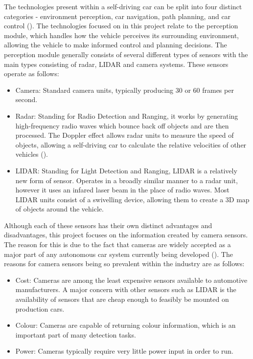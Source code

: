 \documentclass[12pt]{report}
\begin{document}
\vspace{0.5cm}
\begin{flushleft}
The technologies present within a self-driving car can be split into four distinct categories - environment perception, car navigation, path planning, and car control (\cite{zhao2018key}). The technologies focused on in this project relate to the perception module, which handles how the vehicle perceives its surrounding environment, allowing the vehicle to make informed control and planning decisions. The perception module generally consists of several different types of sensors with the main types consisting of radar, LIDAR and camera systems. These sensors operate as follows:
\begin{itemize}
\item Camera: Standard camera units, typically producing 30 or 60 frames per second.
\item Radar: Standing for Radio Detection and Ranging, it works by generating high-frequency radio waves which bounce back off objects and are then processed. The Doppler effect allows radar units to measure the speed of objects, allowing a self-driving car to calculate the relative velocities of other vehicles (\cite{kocic2018sensors}).
\item LIDAR: Standing for Light Detection and Ranging, LIDAR is a relatively new form of sensor. Operates in a broadly similar manner to a radar unit, however it uses an infared laser beam in the place of radio waves. Most LIDAR units consist of a swivelling device, allowing them to create a 3D map of objects around the vehicle.
\end{itemize}

\vspace{0.5cm}
Although each of these sensors has their own distinct advantages and disadvantages, this project focuses on the information created by camera sensors. The reason for this is due to the fact that cameras are widely accepted as a major part of any autonomous car system currently being developed (\cite{kocic2018sensors}). The reasons for camera sensors being so prevalent within the industry are as follows:
\begin{itemize}
\item Cost: Cameras are among the least expensive sensors available to automotive manufacturers. A major concern with other sensors such as LIDAR is the availability of sensors that are cheap enough to feasibly be mounted on production cars.
\item Colour: Cameras are capable of returning colour information, which is an important part of many detection tasks.
\item Power: Cameras typically require very little power input in order to run.
\end{itemize}


\end{flushleft}
\end{document}
